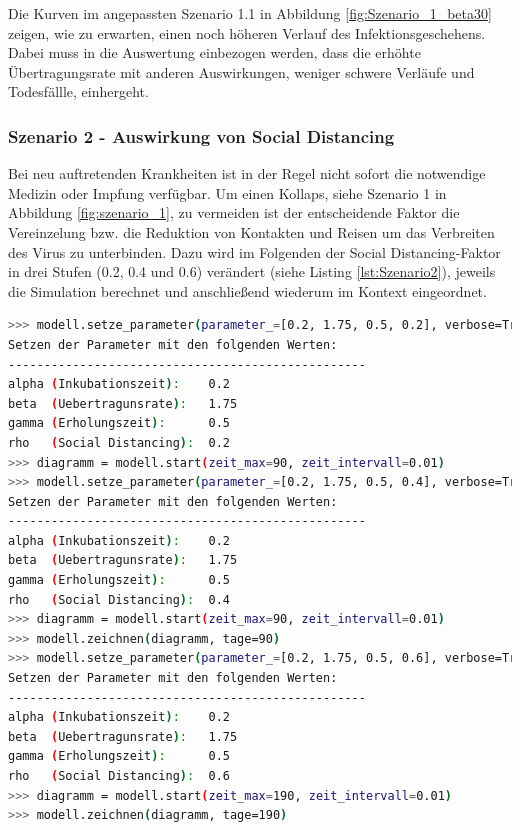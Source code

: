 \documentclass[12pt]{article}
\begin{document}
Die Kurven im angepassten Szenario 1.1 in Abbildung \ref{fig:Szenario_1_beta30} zeigen, wie zu erwarten, einen noch höheren Verlauf des Infektionsgeschehens. Dabei muss in die Auswertung einbezogen werden, dass die erhöhte Übertragungsrate mit anderen Auswirkungen, weniger schwere Verläufe und Todesfällle, einhergeht.

\subsubsection{Szenario 2 - Auswirkung von Social Distancing}
Bei neu auftretenden Krankheiten ist in der Regel nicht sofort die notwendige Medizin oder Impfung verfügbar. Um einen Kollaps, siehe Szenario 1 in Abbildung \ref{fig:szenario_1}, zu vermeiden ist der entscheidende Faktor die Vereinzelung bzw. die Reduktion von Kontakten und Reisen um das Verbreiten des Virus zu unterbinden. Dazu wird im Folgenden der Social Distancing-Faktor in drei Stufen (0.2, 0.4 und 0.6) verändert (siehe Listing \ref{lst:Szenario2}), jeweils die Simulation berechnet und anschließend wiederum im Kontext eingeordnet.

\begin{lstlisting}[language=Bash, caption=Szenario 2 - Social Distancing, label=lst:Szenario2]
>>> modell.setze_parameter(parameter_=[0.2, 1.75, 0.5, 0.2], verbose=True)
Setzen der Parameter mit den folgenden Werten:
--------------------------------------------------
alpha (Inkubationszeit):    0.2
beta  (Uebertragunsrate):   1.75
gamma (Erholungszeit):      0.5
rho   (Social Distancing):  0.2
>>> diagramm = modell.start(zeit_max=90, zeit_intervall=0.01)
>>> modell.setze_parameter(parameter_=[0.2, 1.75, 0.5, 0.4], verbose=True)
Setzen der Parameter mit den folgenden Werten:
--------------------------------------------------
alpha (Inkubationszeit):    0.2
beta  (Uebertragunsrate):   1.75
gamma (Erholungszeit):      0.5
rho   (Social Distancing):  0.4
>>> diagramm = modell.start(zeit_max=90, zeit_intervall=0.01)
>>> modell.zeichnen(diagramm, tage=90)
>>> modell.setze_parameter(parameter_=[0.2, 1.75, 0.5, 0.6], verbose=True)
Setzen der Parameter mit den folgenden Werten:
--------------------------------------------------
alpha (Inkubationszeit):    0.2
beta  (Uebertragunsrate):   1.75
gamma (Erholungszeit):      0.5
rho   (Social Distancing):  0.6
>>> diagramm = modell.start(zeit_max=190, zeit_intervall=0.01)
>>> modell.zeichnen(diagramm, tage=190)
\end{lstlisting}
\end{document}
